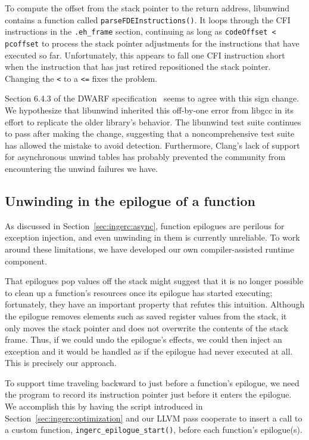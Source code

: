 To compute the offset from the stack pointer to the return address, libunwind
contains a function called \texttt{parseFDEInstructions()}.  It loops through the CFI
instructions in the \texttt{.eh\_frame} section, continuing as long as
\texttt{codeOffset < pcoffset} to process the stack pointer adjustments for the
instructions that have executed so far.  Unfortunately, this appears to fall one CFI
instruction short when the instruction that has just retired repositioned the stack
pointer.  Changing the \texttt{<} to a \texttt{<=} fixes the problem.

Section 6.4.3 of the DWARF specification~\cite{www-dwarf-spec} seems to agree with
this sign change.  We hypothesize that libunwind inherited this off-by-one error from
libgcc in its effort to replicate the older library's behavior.  The libunwind test
suite continues to pass after making the change, suggesting that a noncomprehensive
test suite has
allowed the mistake to avoid detection.  Furthermore, Clang's lack of support for
asynchronous unwind tables has probably prevented the community from encountering the
unwind failures we have.


\subsection{Unwinding in the epilogue of a function}
\label{sec:ingerc:epilogue}

As discussed in Section~\ref{sec:ingerc:async}, function epilogues are perilous for
exception injection, and even unwinding in them is currently unreliable.  To work
around these limitations, we have developed our own compiler-assisted runtime
component.

That epilogues pop values off the stack might suggest that it is no longer possible
to clean up a function's resources once its epilogue has started executing;
fortunately, they have an important property that refutes this intuition.  Although
the epilogue removes elements such as saved register values from the stack, it only
moves the stack pointer and does not overwrite the contents of the stack frame.
Thus, if we could undo the epilogue's effects, we could then inject an exception and
it would be handled as if the epilogue had never executed at all.  This is precisely
our approach.

To support time traveling backward to just before a function's epilogue, we need the
program to record its instruction pointer just before it enters the epilogue.  We
accomplish this by having the script introduced in
Section~\ref{sec:ingerc:optimization} and our LLVM pass cooperate to insert a call to
a custom function, \texttt{ingerc\_epilogue\_start()}, before each function's
epilogue(s).

